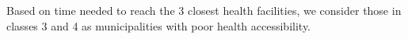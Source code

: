 Based on time needed to reach the 3 closest health facilities, we consider those in classes 3 and 4 as municipalities with poor health accessibility.

























